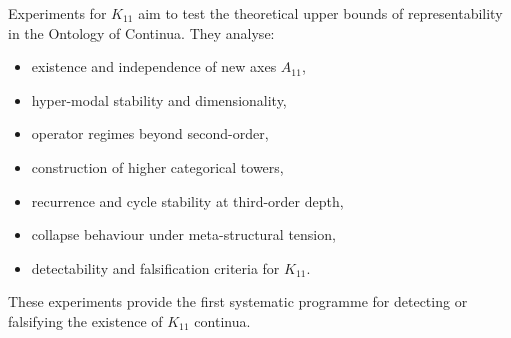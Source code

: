 Experiments for $K_{11}$ aim to test the theoretical upper bounds of
representability in the Ontology of Continua.
They analyse:

\begin{itemize}
    \item existence and independence of new axes $A_{11}$,
    \item hyper-modal stability and dimensionality,
    \item operator regimes beyond second-order,
    \item construction of higher categorical towers,
    \item recurrence and cycle stability at third-order depth,
    \item collapse behaviour under meta-structural tension,
    \item detectability and falsification criteria for $K_{11}$.
\end{itemize}

These experiments provide the first systematic programme for detecting
or falsifying the existence of $K_{11}$ continua.
